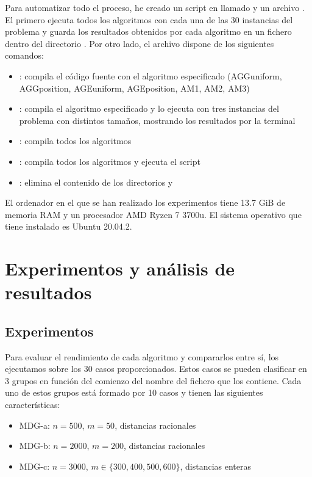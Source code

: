 \documentclass[10pt,a4paper]{article}
\begin{document}
Para automatizar todo el proceso, he creado un script en  llamado  y un archivo . El primero ejecuta todos los algoritmos con cada una de las 30 instancias del problema y guarda los resultados obtenidos por cada algoritmo en un fichero  dentro del directorio . Por otro lado, el archivo  dispone de los siguientes comandos:

\begin{itemize}
	\item {}: compila el código fuente con el algoritmo especificado (AGGuniform, AGGposition, AGEuniform, AGEposition, AM1, AM2, AM3)
	\item {}: compila el algoritmo especificado y lo ejecuta con tres instancias del problema con distintos tamaños, mostrando los resultados por la terminal
	\item {}: compila todos los algoritmos
	\item {}: compila todos los algoritmos y ejecuta el script 
	\item {}: elimina el contenido de los directorios  y 
\end{itemize}

El ordenador en el que se han realizado los experimentos tiene 13.7 GiB de memoria RAM y un procesador AMD Ryzen 7 3700u. El sistema operativo que tiene instalado es Ubuntu 20.04.2.






\section{Experimentos y análisis de resultados}

\subsection{Experimentos}

Para evaluar el rendimiento de cada algoritmo y compararlos entre sí, los ejecutamos sobre los 30 casos proporcionados. Estos casos se pueden clasificar en 3 grupos en función del comienzo del nombre del fichero que los contiene. Cada uno de estos grupos está formado por 10 casos y tienen las siguientes características:

\begin{itemize}
	\item MDG-a: $n = 500$, $m = 50$, distancias racionales
	\item MDG-b: $n = 2000$, $m = 200$, distancias racionales
	\item MDG-c: $n = 3000$, $m \in \{300,400,500,600\}$, distancias enteras
\end{itemize}
\end{document}
